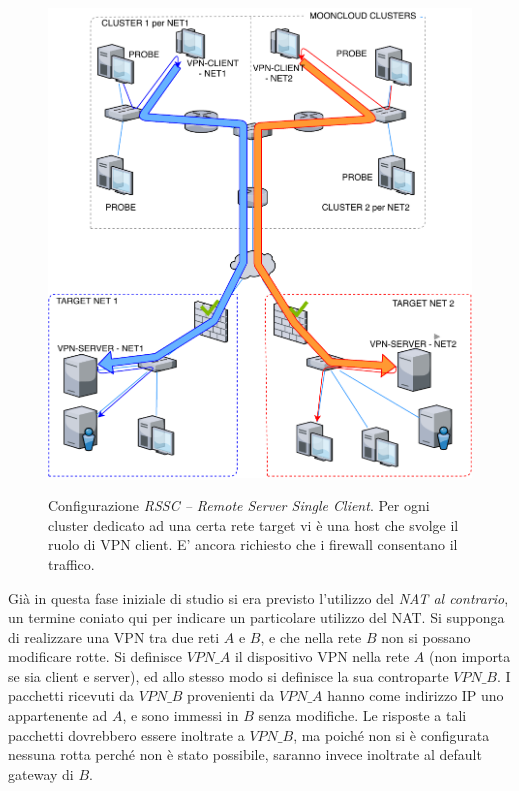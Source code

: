\begin{figure}[h!]
	\includegraphics[scale=0.55]{img/rssc}
	\label{fig:rsmc}
	\caption[Configurazione \textit{RSSC -- Remote Server Single Client}]{Configurazione
		\textit{RSSC -- Remote Server Single Client}. Per ogni cluster dedicato ad una certa rete target
		vi è una host che svolge il ruolo di VPN client. E' ancora richiesto che i firewall
	consentano il traffico.}
\end{figure}

Già in questa fase iniziale di studio si era previsto l'utilizzo del \textit{NAT al contrario},
un termine coniato qui per indicare un particolare utilizzo del NAT. 
Si supponga di realizzare una VPN tra due reti $A$ e $B$, e che
nella rete $B$ non si possano modificare rotte. Si definisce $VPN\_A$ il dispositivo
VPN nella rete $A$ (non
importa se sia client e server), ed allo stesso modo si definisce la sua controparte $VPN\_B$.
I pacchetti ricevuti da $VPN\_B$ provenienti da $VPN\_A$ hanno come indirizzo IP uno appartenente
ad $A$, e sono immessi in $B$ senza modifiche. Le risposte a tali pacchetti dovrebbero essere inoltrate
a $VPN\_B$, ma poiché non si è configurata nessuna rotta perché non è stato possibile, saranno invece
inoltrate al default gateway di $B$.

